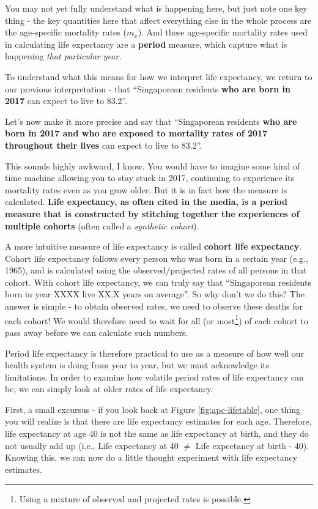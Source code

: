 \documentclass[openany]{book}
\let\rmarkdownfootnote\footnote%
\def\footnote{\protect\rmarkdownfootnote}
\begin{document}
You may not yet fully understand what is happening here, but just note
one key thing - the key quantities here that affect everything else in
the whole process are the age-specific mortality rates (\(m_x\)). And
these age-specific mortality rates used in calculating life expectancy
are a \textbf{period} measure, which capture what is happening
\emph{that particular year}.

To understand what this means for how we interpret life expectancy, we
return to our previous interpretation - that ``Singaporean residents
\textbf{who are born in 2017} can expect to live to 83.2''.

Let's now make it more precise and say that ``Singaporean residents
\textbf{who are born in 2017 and who are exposed to mortality rates of
2017 throughout their lives} can expect to live to 83.2''.

This sounds highly awkward, I know. You would have to imagine some kind
of time machine allowing you to stay stuck in 2017, continuing to
experience its mortality rates even as you grow older. But it is in fact
how the measure is calculated. \textbf{Life expectancy, as often cited
in the media, is a period measure that is constructed by stitching
together the experiences of multiple cohorts} (often called a
\emph{synthetic cohort}).

A more intuitive measure of life expectancy is called \textbf{cohort
life expectancy}. Cohort life expectancy follows every person who was
born in a certain year (e.g., 1965), and is calculated using the
observed/projected rates of all persons in that cohort. With cohort life
expectancy, we can truly say that ``Singaporean residents born in year
XXXX live XX.X years on average''. So why don't we do this? The answer
is simple - to obtain observed rates, we need to observe these deaths
for each cohort! We would therefore need to wait for all (or
most\footnote{Using a mixture of observed and projected rates is
  possible.}) of each cohort to pass away before we can calculate such
numbers.

Period life expectancy is therefore practical to use as a measure of how
well our health system is doing from year to year, but we must
acknowledge its limitations. In order to examine how volatile period
rates of life expectancy can be, we can simply look at older rates of
life expectancy.

First, a small excursus - if you look back at Figure
\ref{fig:apc-lifetable}, one thing you will realize is that there are
life expectancy estimates for each age. Therefore, life expectancy at
age 40 is not the same as life expectancy at birth, and they do not
usually add up (i.e., Life expectancy at 40 \(\neq\) Life expectancy at
birth - 40). Knowing this, we can now do a little thought experiment
with life expectancy estimates.
\end{document}
